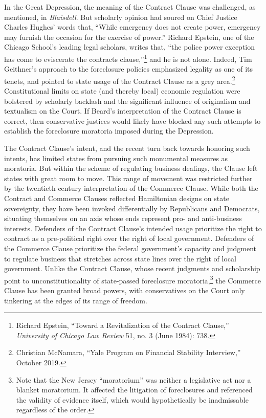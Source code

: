 \documentclass[12pt,oneside]{psthesis}
\begin{document}
In the Great Depression, the meaning of the Contract Clause was challenged, as mentioned, in \emph{Blaisdell}.
But scholarly opinion had soured on Chief Justice Charles Hughes' words that, ``While emergency does not create power, emergency may furnish the occasion for the exercise of power.''
Richard Epstein, one of the Chicago School's leading legal scholars, writes that, ``the police power exception has come to eviscerate the contracts clause,''\footnote{Richard Epstein, ``Toward a Revitalization of the Contract Clause,'' \emph{University of Chicago Law Review} 51, no. 3 (June 1984): 738.} and he is not alone.
Indeed, Tim Geithner's approach to the foreclosure policies emphasized legality as one of its tenets, and pointed to state usage of the Contract Clause as a grey area.\footnote{Christian McNamara, ``Yale Program on Financial Stability Interview,'' October 2019.}
Constitutional limits on state (and thereby local) economic regulation were bolstered by scholarly backlash and the significant influence of originalism and textualism on the Court.
If Beard's interpretation of the Contract Clause is correct, then conservative justices would likely have blocked any such attempts to establish the foreclosure moratoria imposed during the Depression.

The Contract Clause's intent, and the recent turn back towards honoring such intents, has limited states from pursuing such monumental measures as moratoria.
But within the scheme of regulating business dealings, the Clause left states with great room to move.
This range of movement was restricted further by the twentieth century interpretation of the Commerce Clause.
While both the Contract and Commerce Clauses reflected Hamiltonian designs on state sovereignty, they have been invoked differentially by Republicans and Democrats, situating themselves on an axis whose ends represent pro- and anti-business interests.
Defenders of the Contract Clause's intended usage prioritize the right to contract as a pre-political right over the right of local government.
Defenders of the Commerce Clause prioritize the federal government's capacity and judgment to regulate business that stretches across state lines over the right of local government.
Unlike the Contract Clause, whose recent judgments and scholarship point to unconstitutionality of state-passed foreclosure moratoria,\footnote{Note that the New Jersey ``moratorium'' was neither a legislative act nor a blanket moratorium. It affected the litigation of foreclosures and referenced the validity of evidence itself, which would hypothetically be inadmissable regardless of the order.} the Commerce Clause has been granted broad powers, with conservatives on the Court only tinkering at the edges of its range of freedom.
\end{document}
